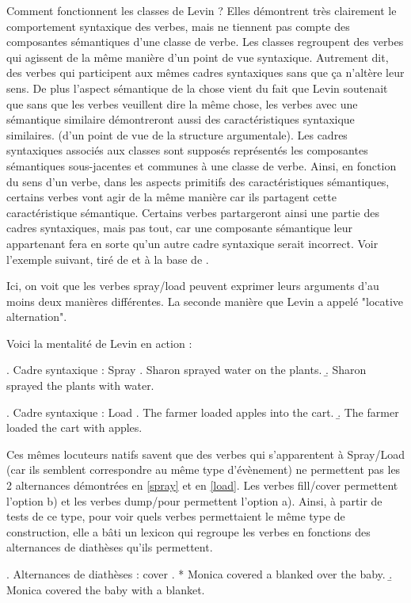 Comment fonctionnent les classes de Levin ? Elles démontrent très clairement le comportement syntaxique des verbes, mais ne tiennent pas compte des composantes sémantiques d'une classe de verbe. Les classes regroupent des verbes qui agissent de la même manière d'un point de vue syntaxique. Autrement dit, des verbes qui participent aux mêmes cadres syntaxiques sans que ça n'altère leur sens. De plus l'aspect sémantique de la chose vient du fait que Levin soutenait que sans que les verbes veuillent dire la même chose, les verbes avec une sémantique similaire démontreront aussi des caractéristiques syntaxique similaires. (d'un point de vue de la structure argumentale). Les cadres syntaxiques associés aux classes sont supposés représentés les composantes sémantiques sous-jacentes et communes à une classe de verbe. Ainsi, en fonction du sens d'un verbe, dans les aspects primitifs des caractéristiques sémantiques, certains verbes vont agir de la même manière car ils partagent cette caractéristique sémantique. Certains verbes partargeront ainsi une partie des cadres syntaxiques, mais pas tout, car une composante sémantique leur appartenant fera en sorte qu'un autre cadre syntaxique serait incorrect. Voir l'exemple suivant, tiré de \citep{SchulerVerbnetBroadcoverageComprehensive2005} et à la base de \citep{verb-classes.levin.1993}.

Ici, on voit que les verbes spray/load peuvent exprimer leurs arguments d'au moins deux manières différentes. La seconde manière que Levin a appelé "locative alternation".

Voici la mentalité de Levin en action :

\ex. \label{spray} Cadre syntaxique : Spray
	\a. Sharon sprayed water on the plants.
	\b. Sharon sprayed the plants with water.
	
\ex. \label{load} Cadre syntaxique : Load
	\a. The farmer loaded apples into the cart.
	\b. The farmer loaded the cart with apples.
	
Ces mêmes locuteurs natifs savent que des verbes qui s'apparentent à Spray/Load (car ils semblent correspondre au même type d'évènement) ne permettent pas les 2 alternances démontrées en \ref{spray} et en \ref{load}. Les verbes fill/cover permettent l'option b) et les verbes dump/pour permettent l'option a). Ainsi, à partir de tests de ce type, pour voir quels verbes permettaient le même type de construction, elle a bâti un lexicon qui regroupe les verbes en fonctions des alternances  de diathèses qu'ils permettent.
	
\ex. \label{cover} Alternances de diathèses : cover
	\a. * Monica covered a blanked over the baby.
	\b. Monica covered the baby with a blanket.

